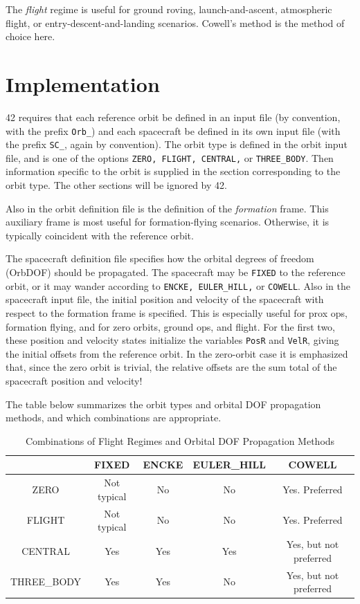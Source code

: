 \documentclass[12pt]{article}
\begin{document}
The {\em flight} regime is useful for ground roving, launch-and-ascent, atmospheric flight, or entry-descent-and-landing scenarios.  Cowell's method is the method of choice here.

\section{Implementation}

42 requires that each reference orbit be defined in an input file (by convention, with the prefix {\tt Orb\_}) and each spacecraft be defined in its own input file (with the prefix {\tt SC\_}, again by convention).  The orbit type is defined in the orbit input file, and is one of the options {\tt ZERO, FLIGHT, CENTRAL,} or {\tt THREE\_BODY}.  Then information specific to the orbit is supplied in the section corresponding to the orbit type.  The other sections will be ignored by 42.

Also in the orbit definition file is the definition of the {\em formation} frame.  This auxiliary frame is most useful for formation-flying scenarios.  Otherwise, it is typically coincident with the reference orbit.

The spacecraft definition file specifies how the orbital degrees of freedom (OrbDOF) should be propagated.  The spacecraft may be {\tt FIXED} to the reference orbit, or it may wander according to {\tt ENCKE, EULER\_HILL,} or {\tt COWELL}.  Also in the spacecraft input file, the initial position and velocity of the spacecraft with respect to the formation frame is specified.  This is especially useful for prox ops, formation flying, and for zero orbits, ground ops, and flight.  For the first  two, these position and velocity states initialize the variables {\tt PosR} and {\tt VelR}, giving the initial offsets from the reference orbit.  In the zero-orbit case it is emphasized that, since the zero orbit is trivial, the relative offsets are the sum total of the spacecraft position and velocity!

The table below summarizes the orbit types and orbital DOF propagation methods, and which combinations are appropriate.
\begin{table}[h]
\caption{Combinations of Flight Regimes and Orbital DOF Propagation Methods}
\begin{center}
\begin{tabular}{|c||c|c|c|c|} \hline
                           & FIXED & ENCKE & EULER\_HILL & COWELL \\ \hline \hline
 ZERO               &  Not typical & No   & No                & Yes.  Preferred \\ \hline
 FLIGHT            &  Not typical & No   & No                & Yes.  Preferred \\ \hline
 CENTRAL         & Yes      & Yes        & Yes               & Yes, but not preferred \\ \hline
 THREE\_BODY & Yes       & Yes        & No                & Yes, but not preferred \\ \hline

\end{tabular}
\end{center}
\label{tab:Orb}
\end{table}%
\end{document}
